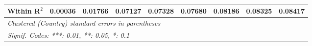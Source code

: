 \begin{table}[htbp]
\begin{tabular}{lcccccccc}
      Within R$^2$                                                    & 0.00036  & 0.01766  & 0.07127         & 0.07328         & 0.07680         & 0.08186         & 0.08325         & 0.08417\\  
      \midrule \midrule
      \multicolumn{9}{l}{\emph{Clustered (Country) standard-errors in parentheses}}\\
      \multicolumn{9}{l}{\emph{Signif. Codes: ***: 0.01, **: 0.05, *: 0.1}}\\
   \end{tabular}
\end{table}


